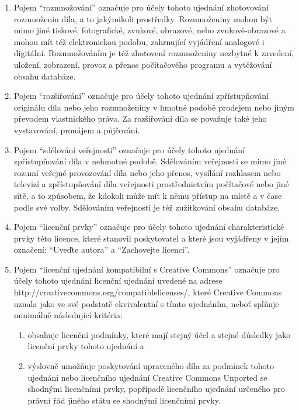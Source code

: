 \begin{enumerate}
\begin{enumerate}
      \item Pojem ``rozmnožování'' označuje pro účely tohoto ujednání zhotovování rozmnoženin díla, a to jakýmikoli prostředky. Rozmnoženiny mohou být mimo jiné tiskové, fotografické, zvukové, obrazové, nebo zvukově-obrazové a mohou mít též elektronickou podobu, zahrnující vyjádření analogové i digitální. Rozmnožováním je též zhotovení rozmnoženiny nezbytné k zavedení, uložení, zobrazení, provoz a přenos počítačového programu a vytěžování obsahu databáze.
      \item Pojem ``rozšiřování'' označuje pro účely tohoto ujednání zpřístupňování originálu díla nebo jeho rozmnoženiny v hmotné podobě prodejem nebo jiným převodem vlastnického práva. Za rozšiřování díla se považuje také jeho vystavování, pronájem a půjčování.
      \item Pojem ``sdělování veřejnosti'' označuje pro účely tohoto ujednání zpřístupňování díla v nehmotné podobě. Sdělováním veřejnosti se mimo jiné rozumí veřejné provozování díla nebo jeho přenos, vysílání rozhlasem nebo televizí a zpřístupňování díla veřejnosti prostřednictvím počítačové nebo jiné sítě, a to způsobem, že kdokoli může mít k němu přístup na místě a v čase podle své volby. Sdělováním veřejnosti je též zužitkování obsahu databáze.
      \item Pojem ``licenční prvky'' označuje pro účely tohoto ujednání charakteristické prvky této licence, které stanovil poskytovatel a které jsou vyjádřeny v jejím označení: ``Uveďte autora'' a ``Zachovejte licenci''.
      \item Pojem ``licenční ujednání kompatibilní s Creative Commons'' označuje pro účely tohoto ujednání licenční ujednání uvedené na adrese http://creativecommons.org/compatiblelicenses/, které Creative Commons uznala jako ve své podstatě ekvivalentní s tímto ujednáním, neboť splňuje minimálně následující kritéria:
        \begin{enumerate}
          \item obsahuje licenční podmínky, které mají stejný účel a stejné důsledky jako licenční prvky tohoto ujednání a
          \item výslovně umožňuje poskytování upraveného díla za podmínek tohoto ujednání nebo licenčního ujednání Creative Commons Unported se shodnými licenčními prvky, popřípadě licenčního ujednání určeného pro právní řád jiného státu se shodnými licenčními prvky.
        \end{enumerate}
    \end{enumerate}


\end{enumerate}
